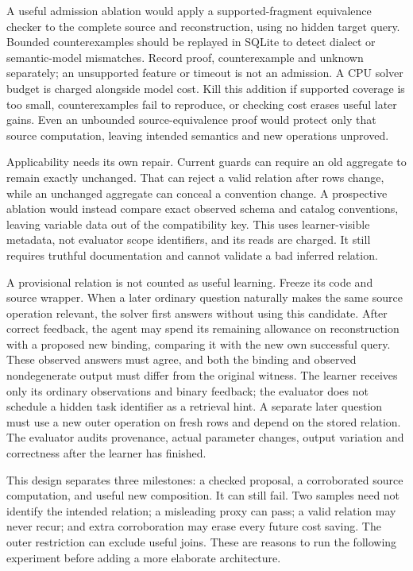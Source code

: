 \documentclass[10pt,twocolumn]{article}
\begin{document}
A useful admission ablation would apply a supported-fragment equivalence checker
to the complete source and reconstruction, using no hidden target query.
Bounded counterexamples should be replayed in SQLite to detect dialect or
semantic-model mismatches. Record proof, counterexample and unknown separately;
an unsupported feature or timeout is not an admission. A CPU solver budget is
charged alongside model cost. Kill this addition if supported coverage is too
small, counterexamples fail to reproduce, or checking cost erases useful later
gains. Even an unbounded source-equivalence proof would protect only that
source computation, leaving intended semantics and new operations unproved.

Applicability needs its own repair. Current guards can require an old aggregate
to remain exactly unchanged. That can reject a valid relation after rows change,
while an unchanged aggregate can conceal a convention change. A prospective
ablation would instead compare exact observed schema and catalog conventions,
leaving variable data out of the compatibility key. This uses learner-visible
metadata, not evaluator scope identifiers, and its reads are charged. It still
requires truthful documentation and cannot validate a bad inferred relation.

A provisional relation is not counted as useful learning. Freeze its code and
source wrapper. When a later ordinary question naturally makes the same source
operation relevant, the solver first answers without using this candidate. After
correct feedback, the agent may spend its remaining allowance on reconstruction
with a proposed new binding, comparing it with the new own successful query.
These observed answers must agree, and both the binding and observed
nondegenerate output must differ from the original witness. The learner receives
only its ordinary observations and binary feedback; the evaluator does not
schedule a hidden task identifier as a retrieval hint. A separate later question
must use a new outer operation on fresh rows and depend on the stored relation.
The evaluator audits provenance, actual parameter changes, output variation and
correctness after the learner has finished.

This design separates three milestones: a checked proposal, a corroborated
source computation, and useful new composition. It can still fail. Two samples
need not identify the intended relation; a misleading proxy can pass; a valid
relation may never recur; and extra corroboration may erase every future cost
saving. The outer restriction can exclude useful joins. These are reasons to
run the following experiment before adding a more elaborate architecture.
\end{document}

